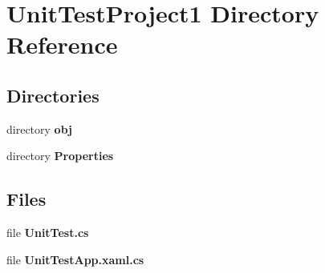 \section{Unit\+Test\+Project1 Directory Reference}
\label{dir_22653ed265cb75be2fbff4d36e610ce8}
\subsection*{Directories}
\begin{DoxyCompactItemize}
\item 
directory \textbf{ obj}
\item 
directory \textbf{ Properties}
\end{DoxyCompactItemize}
\subsection*{Files}
\begin{DoxyCompactItemize}
\item 
file \textbf{ Unit\+Test.\+cs}
\item 
file \textbf{ Unit\+Test\+App.\+xaml.\+cs}
\end{DoxyCompactItemize}
